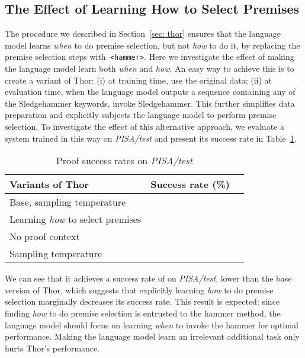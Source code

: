 \documentclass{article}
\begin{document}
\subsection{The Effect of Learning How to Select Premises}
The procedure we described in Section~\ref{sec: thor} ensures that the language model learns \emph{when} to do premise selection, but not \emph{how} to do it, by replacing the premise selection steps with\texttt{ <hammer>}.
Here we investigate the effect of making the language model learn both \emph{when} and \emph{how}.
An easy way to achieve this is to create a variant of Thor: (i) at training time, use the original data; (ii) at evaluation time, when the language model outputs a sequence containing any of the Sledgehammer keywords, invoke Sledgehammer. This further simplifies data preparation and explicitly subjects the language model to perform premise selection.
To investigate the effect of this alternative approach, we evaluate a system trained in this way on \emph{PISA/test} and present its success rate in Table~\ref{tab: thor/isa variant}.
\begin{table}[t]
    \begin{minipage}{\linewidth}
      \centering
        \caption{Proof success rates on \emph{PISA/test}}
        \label{tab: thor/isa variant}
        \centering
        \begin{tabular}{lcc}
            \toprule
            Variants of Thor   & Success rate (\%)\\ 
            \midrule
            Base, sampling temperature  &  \\
            \midrule
            Learning \emph{how} to select premises &  \\
            No proof context &  \\
            Sampling temperature  &  \\
            \bottomrule
        \end{tabular}
    \end{minipage}
\end{table}
We can see that it achieves a success rate of  on \emph{PISA/test},  lower than the base version of Thor, which suggests that explicitly learning \emph{how} to do premise selection marginally decreases its success rate. This result is expected: since finding \emph{how} to do premise selection is entrusted to the hammer method, the language model should focus on learning \emph{when} to invoke the hammer for optimal performance. Making the language model learn an irrelevant additional task only hurts Thor's performance.
\end{document}
